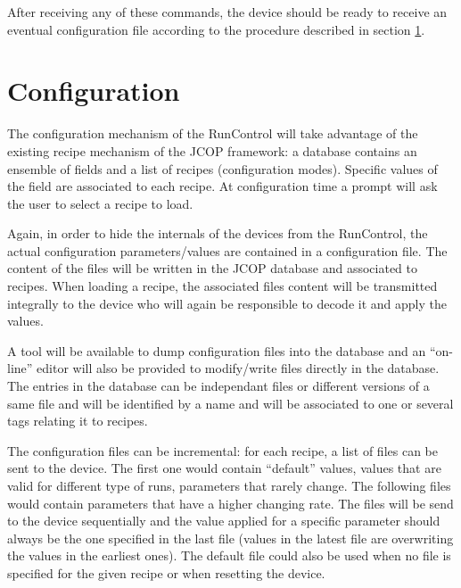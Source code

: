\documentclass[a4paper]{article}
\begin{document}
After receiving any of these commands, the device should be ready to receive an eventual
configuration file according to the procedure described in section \ref{sec:configuration}.

\section{Configuration}\label{sec:configuration}
The configuration mechanism of the RunControl will take advantage of the existing recipe mechanism
of the JCOP\cite{biblio:JCOP} framework: a database contains an ensemble of fields and a list of
recipes (configuration modes). Specific values of the field are associated to each recipe. At
configuration time a prompt will ask the user to select a recipe to load.

Again, in order to hide the internals of the devices from the RunControl, the actual configuration
parameters/values are contained in a configuration file. The content of the files will be written in
the JCOP database and associated to recipes. When loading a recipe, the associated files content
will be transmitted integrally to the device who will again be responsible to decode it and apply
the values.

A tool will be available to dump configuration files into the database and an ``on-line'' editor will
also be provided to modify/write files directly in the database. The entries in the database can be
independant files or different versions of a same file and will be identified by a name and will
be associated to one or several tags relating it to recipes.

The configuration files can be incremental: for each recipe, a list of files can be sent to the
device. The first one would contain ``default'' values, values that are valid for different type of
runs, parameters that rarely change. The following files would contain parameters that have a
higher changing rate. The files will be send to the device sequentially and the value applied for a
specific parameter should always be the one specified in the last file (values in the latest file
are overwriting the values in the earliest ones). The default file could also be used when no file
is specified for the given recipe or when resetting the device.
\end{document}
